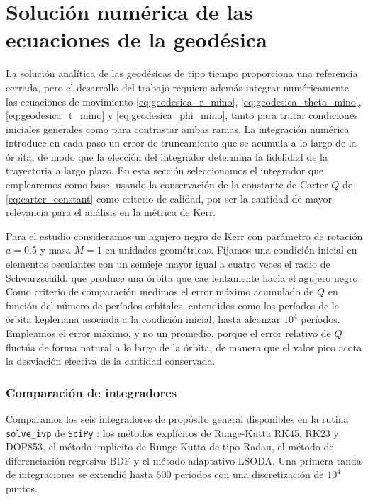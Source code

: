 \section{Solución numérica de las ecuaciones de la geodésica}

La solución analítica de las geodésicas de tipo tiempo proporciona una referencia cerrada, pero el desarrollo del trabajo requiere además integrar numéricamente las ecuaciones de movimiento \eqref{eq:geodesica_r_mino}, \eqref{eq:geodesica_theta_mino}, \eqref{eq:geodesica_t_mino} y \eqref{eq:geodesica_phi_mino}, tanto para tratar condiciones iniciales generales como para contrastar ambas ramas. La integración numérica introduce en cada paso un error de truncamiento que se acumula a lo largo de la órbita, de modo que la elección del integrador determina la fidelidad de la trayectoria a largo plazo. En esta sección seleccionamos el integrador que emplearemos como base, usando la conservación de la constante de Carter $Q$ de \eqref{eq:carter_constant} como criterio de calidad, por ser la cantidad de mayor relevancia para el análisis en la métrica de Kerr.

Para el estudio consideramos un agujero negro de Kerr con parámetro de rotación $a = 0.5$ y masa $M = 1$ en unidades geométricas. Fijamos una condición inicial en elementos osculantes con un semieje mayor igual a cuatro veces el radio de Schwarzschild, que produce una órbita que cae lentamente hacia el agujero negro. Como criterio de comparación medimos el error máximo acumulado de $Q$ en función del número de períodos orbitales, entendidos como los períodos de la órbita kepleriana asociada a la condición inicial, hasta alcanzar $10^4$ períodos. Empleamos el error máximo, y no un promedio, porque el error relativo de $Q$ fluctúa de forma natural a lo largo de la órbita, de manera que el valor pico acota la desviación efectiva de la cantidad conservada.

\subsubsection{Comparación de integradores}

Comparamos los seis integradores de propósito general disponibles en la rutina \texttt{solve\_ivp} de \texttt{SciPy} \cite{virtanen2020scipy}: los métodos explícitos de Runge-Kutta RK45, RK23 y DOP853, el método implícito de Runge-Kutta de tipo Radau, el método de diferenciación regresiva BDF y el método adaptativo LSODA. Una primera tanda de integraciones se extendió hasta $500$ períodos con una discretización de $10^4$ puntos.

